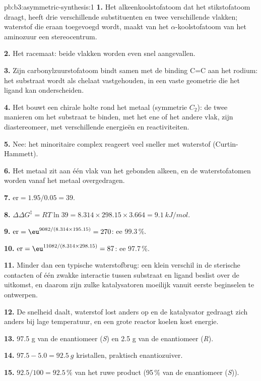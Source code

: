 \begin{solution}{pb:b3:asymmetric-synthesis:1}
\textbf{1.} Het alkeenkoolstofatoom dat het stikstofatoom draagt, heeft drie
verschillende substituenten en twee verschillende vlakken; waterstof die
eraan toegevoegd wordt, maakt van het $\alpha$-koolstofatoom van het aminozuur een
stereocentrum.

\textbf{2.} Het racemaat: beide vlakken worden even snel aangevallen.

\textbf{3.} Zijn carbonylzuurstofatoom bindt samen met de binding C=C aan
het rodium: het substraat wordt als chelaat vastgehouden, in een vaste
geometrie die het ligand kan onderscheiden.

\textbf{4.} Het bouwt een chirale holte rond het metaal (symmetrie $C_2$): de twee manieren om
het substraat te binden, met het ene of het andere vlak, zijn
diastereomeer, met verschillende energieën en reactiviteiten.

\textbf{5.} Nee: het minoritaire complex reageert veel sneller met
waterstof (Curtin-Hammett).

\textbf{6.} Het metaal zit aan één vlak van het gebonden alkeen, en de
waterstofatomen worden vanaf het metaal overgedragen.

\textbf{7.} $\mathrm{er} = 1.95/0.05 = 39$.

\textbf{8.} $\Delta\Delta G^\ddagger = RT\ln 39 = 8.314 \times 298.15 \times 3.664 = \qty{9.1}{kJ/mol}$.

\textbf{9.} $\mathrm{er} = \eu^{9082/(8.314 \times 195.15)} = 270$: ee 99.3\,\%.

\textbf{10.} $\mathrm{er} = \eu^{11082/(8.314 \times 298.15)} = 87$: ee 97.7\,\%.

\textbf{11.} Minder dan een typische waterstofbrug: een klein verschil in
de sterische contacten of één zwakke interactie tussen substraat en
ligand beslist over de uitkomst, en daarom zijn zulke katalysatoren
moeilijk vanuit eerste beginselen te ontwerpen.

\textbf{12.} De snelheid daalt, waterstof lost anders op en de katalysator
gedraagt zich anders bij lage temperatuur, en een grote reactor koelen
kost energie.

\textbf{13.} 97.5 g van de enantiomeer (\textit{S}) en 2.5 g van de enantiomeer (\textit{R}).

\textbf{14.} $97.5 - 5.0 = \qty{92.5}{g}$ kristallen, praktisch enantiozuiver.

\textbf{15.} $92.5/100 = 92.5$\,\% van het ruwe product (95\,\% van de enantiomeer (\textit{S})).


\end{solution}
